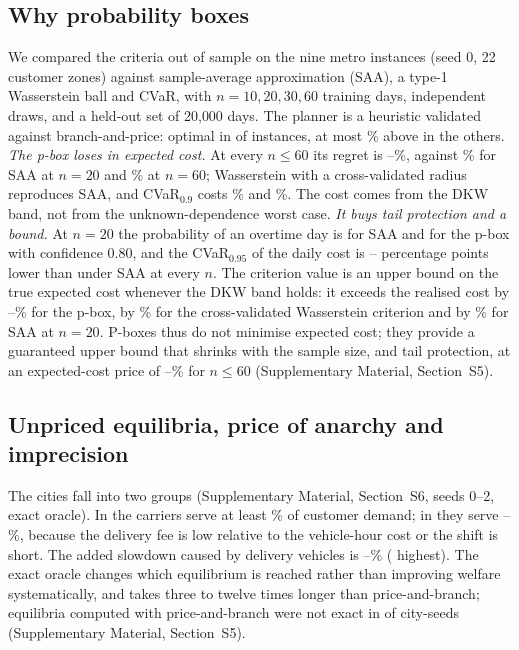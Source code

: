 \documentclass[preprint,11pt]{elsarticle}
\theoremstyle{definition}
\theoremstyle{remark}
\newcommand{\SM}[1]{Supplementary Material, Section~#1}
\begin{document}
\subsection{Why probability boxes}\label{sec:res-pbox}

We compared the criteria out of sample on the nine metro instances (seed 0, 22 customer zones) against sample-average approximation (SAA), a type-1 Wasserstein ball and CVaR, with $n=10,20,30,60$ training days, \AmbDraws{} independent draws, and a held-out set of 20{,}000 days. The planner is a heuristic validated against branch-and-price: optimal in \AmbValOptN{} of \AmbValRows{} instances, at most \AmbValMaxGap\% above in the others. \emph{The p-box loses in expected cost.} At every $n\le60$ its regret is \AmbRegMin--\AmbRegMax\%, against \AmbSaaRegTwoZero\% for SAA at $n=20$ and \AmbSaaRegSixZero\% at $n=60$; Wasserstein with a cross-validated radius reproduces SAA, and CVaR$_{0.9}$ costs \AmbCvarRegTwoZero\% and \AmbCvarRegSixZero\%. The cost comes from the DKW band, not from the unknown-dependence worst case. \emph{It buys tail protection and a bound.} At $n=20$ the probability of an overtime day is \AmbOtSaaTwoZero{} for SAA and \AmbOtPbTwoZero{} for the p-box with confidence 0.80, and the CVaR$_{0.95}$ of the daily cost is \AmbCvarGainLo--\AmbCvarGainHi{} percentage points lower than under SAA at every $n$. The criterion value is an upper bound on the true expected cost whenever the DKW band holds: it exceeds the realised cost by \AmbDisPbMin--\AmbDisPbMax\% for the p-box, by \AmbDisWcvTwoZero\% for the cross-validated Wasserstein criterion and by \AmbDisSaaTwoZero\% for SAA at $n=20$. P-boxes thus do not minimise expected cost; they provide a guaranteed upper bound that shrinks with the sample size, and tail protection, at an expected-cost price of \AmbRegMin--\AmbRegMax\% for $n\le60$ (\SM{S5}).

\subsection{Unpriced equilibria, price of anarchy and imprecision}\label{sec:res-eq}\label{sec:res-poa}\label{sec:res-engine}

The cities fall into two groups (\SM{S6}, seeds 0--2, exact oracle). In \EoneHighCities{} the carriers serve at least \EoneServedHighMin\% of customer demand; in \EoneLowCities{} they serve \EoneServedLowMin--\EoneServedLowMax\%, because the delivery fee is low relative to the vehicle-hour cost or the shift is short. The added slowdown caused by delivery vehicles is \EoneSlowMin--\EoneSlowMax\% (\EoneSlowMaxCity{} highest). The exact oracle changes which equilibrium is reached rather than improving welfare systematically, and takes three to twelve times longer than price-and-branch; equilibria computed with price-and-branch were not exact in \ExOldBadN{} of \ExOldN{} city-seeds (\SM{S5}).
\end{document}
